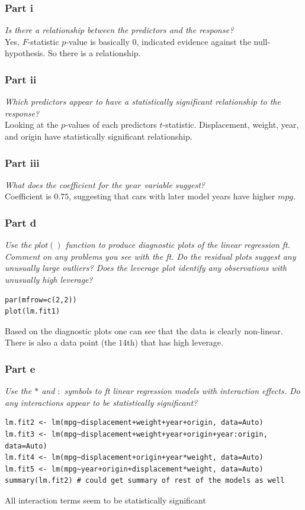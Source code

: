 \documentclass[11pt]{article}
\begin{document}
\subsubsection*{Part i}
\textit{Is there a relationship between the predictors and the response?} \\
Yes, $F$-statistic $p$-value is basically $0$, indicated evidence against the null-hypothesis. So there is a relationship.
\subsubsection*{Part ii}
\textit{Which predictors appear to have a statistically significant relationship to the response?} \\
Looking at the $p$-values of each predictors $t$-statistic. Displacement, weight, year, and origin have statistically significant relationship.
\subsubsection*{Part iii}
\textit{What does the coefficient for the $year$ variable suggest?} \\
Coefficient is $0.75$, suggesting that cars with later model years have higher $mpg$.
\subsubsection*{Part d}
\textit{Use the $plot()$ function to produce diagnostic plots of the linear regression ft. Comment on any problems you see with the ft. Do the residual plots suggest any unusually large outliers? Does the leverage plot identify any observations with unusually high leverage?}
\begin{lstlisting}
par(mfrow=c(2,2))
plot(lm.fit1)
\end{lstlisting}
Based on the diagnostic plots one can see that the data is clearly non-linear. There is also a data point (the $14$th) that has high leverage.
\subsubsection*{Part e}
\textit{Use the $*$ and $:$ symbols to ft linear regression models with interaction effects. Do any interactions appear to be statistically significant?}
\begin{lstlisting}
lm.fit2 <- lm(mpg~displacement+weight+year+origin, data=Auto)
lm.fit3 <- lm(mpg~displacement+weight+year+origin+year:origin, data=Auto)
lm.fit4 <- lm(mpg~displacement+origin+year*weight, data=Auto)
lm.fit5 <- lm(mpg~year+origin+displacement*weight, data=Auto)
summary(lm.fit2) # could get summary of rest of the models as well
\end{lstlisting}
All interaction terms seem to be statistically significant
\end{document}
